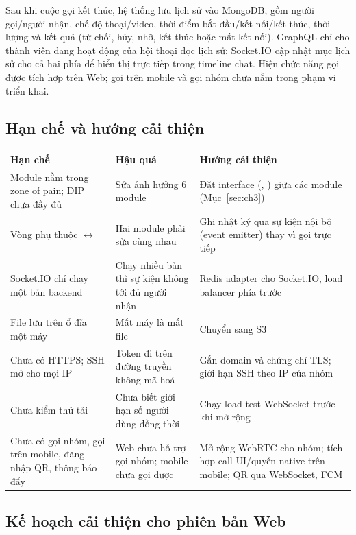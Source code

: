 \documentclass[11pt, a4paper]{article}
\begin{document}
Sau khi cuộc gọi kết thúc, hệ thống lưu lịch sử vào MongoDB, gồm người gọi/người nhận, chế độ thoại/video, thời điểm bắt đầu/kết nối/kết thúc, thời lượng và kết quả (từ chối, hủy, nhỡ, kết thúc hoặc mất kết nối). GraphQL chỉ cho thành viên đang hoạt động của hội thoại đọc lịch sử; Socket.IO cập nhật mục lịch sử cho cả hai phía để hiển thị trực tiếp trong timeline chat. Hiện chức năng gọi được tích hợp trên Web; gọi trên mobile và gọi nhóm chưa nằm trong phạm vi triển khai.

\subsection{Hạn chế và hướng cải thiện}
\begin{table}[H]
  \centering
  \small
  \begin{tabularx}{\linewidth}{YYY}
    \toprule
    \textbf{Hạn chế} & \textbf{Hậu quả} & \textbf{Hướng cải thiện} \\
    \midrule
    Module  nằm trong zone of pain; DIP chưa đầy đủ & Sửa  ảnh hưởng 6 module & Đặt interface (, ) giữa các module (Mục~\ref{sec:ch3}) \\
    Vòng phụ thuộc  $\leftrightarrow$  & Hai module phải sửa cùng nhau & Ghi nhật ký qua sự kiện nội bộ (event emitter) thay vì gọi trực tiếp \\
    Socket.IO chỉ chạy một bản backend & Chạy nhiều bản thì sự kiện không tới đủ người nhận & Redis adapter cho Socket.IO, load balancer phía trước \\
    File lưu trên ổ đĩa một máy & Mất máy là mất file & Chuyển  sang S3 \\
    Chưa có HTTPS; SSH mở cho mọi IP & Token đi trên đường truyền không mã hoá & Gắn domain và chứng chỉ TLS; giới hạn SSH theo IP của nhóm \\
    Chưa kiểm thử tải & Chưa biết giới hạn số người dùng đồng thời & Chạy load test WebSocket trước khi mở rộng \\
    Chưa có gọi nhóm, gọi trên mobile, đăng nhập QR, thông báo đẩy & Web chưa hỗ trợ gọi nhóm; mobile chưa gọi được & Mở rộng WebRTC cho nhóm; tích hợp call UI/quyền native trên mobile; QR qua WebSocket, FCM \\
    \bottomrule
  \end{tabularx}
\end{table}

\subsection{Kế hoạch cải thiện cho phiên bản Web}
\label{subsec:web-improvement-plan}
\end{document}
